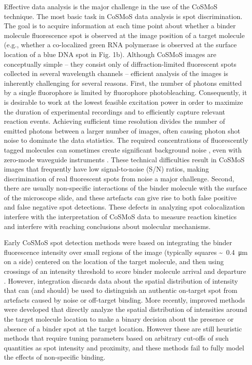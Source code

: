 Effective data analysis is the major challenge in the use of the CoSMoS technique. The most basic task in CoSMoS data analysis is spot discrimination. The goal is to acquire information at each time point about whether a binder molecule fluorescence spot is observed at the image position of a target molecule (e.g., whether a co-localized green RNA polymerase is observed at the surface location of a blue DNA spot in Fig. 1b). Although CoSMoS images are conceptually simple -- they consist only of diffraction-limited fluorescent spots collected in several wavelength channels -- efficient analysis of the images is inherently challenging for several reasons. First, the number of photons emitted by a single fluorophore is limited by fluorophore photobleaching. Consequently, it is desirable to work at the lowest feasible excitation power in order to maximize the duration of experimental recordings and to efficiently capture relevant reaction events. Achieving sufficient time resolution divides the number of emitted photons between a larger number of images, often causing photon shot noise to dominate the data statistics. The required concentrations of fluorescently tagged molecules can sometimes create significant background noise \cite{Peng2018-ge, Van_Oijen2011-ig}, even with zero-mode waveguide instruments \cite{Chen2014-jd}. These technical difficulties result in CoSMoS images that frequently have low signal-to-noise (S/N) ratios, making discrimination of real fluorescent spots from noise a major challenge. Second, there are usually non-specific interactions of the binder molecule with the surface of the microscope slide, and these artefacts can give rise to both false positive and false negative spot detections. These defects in analyzing spot colocalization interfere with the interpretation of CoSMoS data to measure reaction kinetics and interfere with reaching conclusions about molecular mechanisms.

Early CoSMoS spot detection methods were based on integrating the binder fluorescence intensity over small regions of the image (typically squares \SI{0.4}[\sim]{\um} on a side) centered on the location of the target molecule, and then using crossings of an intensity threshold to score binder molecule arrival and departure \cite{Friedman2015-nx}. However, integration discards data about the spatial distribution of intensity that can (and should) be used to distinguish an  authentic on-target spot from artefacts caused by noise or off-target binding.  More recently, improved methods \cite{Friedman2015-nx,Smith2019-yb} were developed that directly analyze the spatial distribution of intensities around the target molecule location to make a binary decision about the presence or absence of a binder spot at the target location.  However these are still heuristic methods that require tuning parameters based on arbitrary cut-offs of such quantities as spot intensity and proximity, and these methods fail to fully model the effects of non-specific binding.

